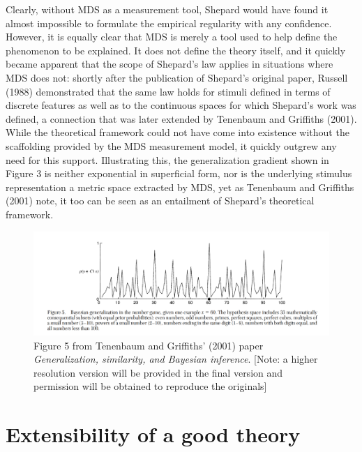\documentclass[english,doc]{apa6}
\begin{document}
Clearly, without MDS as a measurement tool, Shepard would have found it almost impossible to formulate the empirical regularity with any confidence. However, it is equally clear that MDS is merely a tool used to help define the phenomenon to be explained. It does not define the theory itself, and it quickly became apparent that the scope of Shepard's law applies in situations where MDS does not: shortly after the publication of Shepard's original paper, Russell (1988) demonstrated that the same law holds for stimuli defined in terms of discrete features as well as to the continuous spaces for which Shepard's work was defined, a connection that was later extended by Tenenbaum and Griffiths (2001). While the theoretical framework could not have come into existence without the scaffolding provided by the MDS measurement model, it quickly outgrew any need for this support. Illustrating this, the generalization gradient shown in Figure 3 is neither exponential in superficial form, nor is the underlying stimulus representation a metric space extracted by MDS, yet as Tenenbaum and Griffiths (2001) note, it too can be seen as an entailment of Shepard's theoretical framework.



\begin{figure}[t]
\includegraphics[width=6.07in]{tenenbaum_figure5} \caption{Figure 5 from Tenenbaum and Griffiths' (2001) paper \emph{Generalization, similarity, and Bayesian inference}. {[}Note: a higher resolution version will be provided in the final version and permission will be obtained to reproduce the originals{]}}\label{fig:unnamed-chunk-3}
\end{figure}

\hypertarget{extensibility-of-a-good-theory}{%
\section{Extensibility of a good theory}\label{extensibility-of-a-good-theory}}
\end{document}
